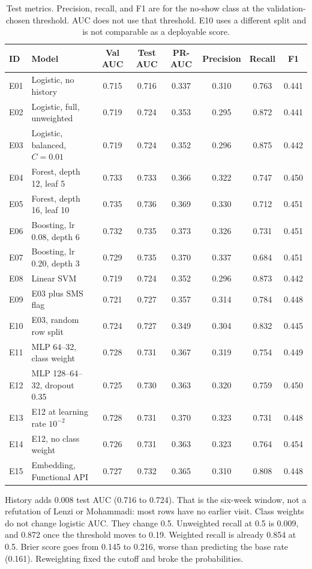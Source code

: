 \documentclass[conference]{IEEEtran}
\begin{document}
\begin{table}[t]
\centering
\caption{Test metrics. Precision, recall, and F1 are for the no-show class at the validation-chosen threshold. AUC does not use that threshold. E10 uses a different split and is not comparable as a deployable score.}
\label{tab:main}
\footnotesize
\begin{tabular}{llcccccc}
\toprule
ID & Model & Val AUC & Test AUC & PR-AUC & Precision & Recall & F1 \\
\midrule
E01 & Logistic, no history & 0.715 & 0.716 & 0.337 & 0.310 & 0.763 & 0.441 \\
E02 & Logistic, full, unweighted & 0.719 & 0.724 & 0.353 & 0.295 & 0.872 & 0.441 \\
E03 & Logistic, balanced, $C{=}0.01$ & 0.719 & 0.724 & 0.352 & 0.296 & 0.875 & 0.442 \\
E04 & Forest, depth 12, leaf 5 & 0.733 & 0.733 & 0.366 & 0.322 & 0.747 & 0.450 \\
E05 & Forest, depth 16, leaf 10 & 0.735 & 0.736 & 0.369 & 0.330 & 0.712 & 0.451 \\
E06 & Boosting, lr 0.08, depth 6 & 0.732 & 0.735 & 0.373 & 0.326 & 0.731 & 0.451 \\
E07 & Boosting, lr 0.20, depth 3 & 0.729 & 0.735 & 0.370 & 0.337 & 0.684 & 0.451 \\
E08 & Linear SVM & 0.719 & 0.724 & 0.352 & 0.296 & 0.873 & 0.442 \\
E09 & E03 plus SMS flag & 0.721 & 0.727 & 0.357 & 0.314 & 0.784 & 0.448 \\
E10 & E03, random row split & 0.724 & 0.727 & 0.349 & 0.304 & 0.832 & 0.445 \\
E11 & MLP 64--32, class weight & 0.728 & 0.731 & 0.367 & 0.319 & 0.754 & 0.449 \\
E12 & MLP 128--64--32, dropout 0.35 & 0.725 & 0.730 & 0.363 & 0.320 & 0.759 & 0.450 \\
E13 & E12 at learning rate $10^{-2}$ & 0.728 & 0.731 & 0.370 & 0.323 & 0.731 & 0.448 \\
E14 & E12, no class weight & 0.726 & 0.731 & 0.363 & 0.323 & 0.764 & 0.454 \\
E15 & Embedding, Functional API & 0.727 & 0.732 & 0.365 & 0.310 & 0.808 & 0.448 \\
\bottomrule
\end{tabular}
\end{table}

History adds 0.008 test AUC (0.716 to 0.724). That is the six-week window, not a refutation of Lenzi or Mohammadi: most rows have no earlier visit. Class weights do not change logistic AUC. They change 0.5. Unweighted recall at 0.5 is 0.009, and 0.872 once the threshold moves to 0.19. Weighted recall is already 0.854 at 0.5. Brier score goes from 0.145 to 0.216, worse than predicting the base rate (0.161). Reweighting fixed the cutoff and broke the probabilities.
\end{document}
